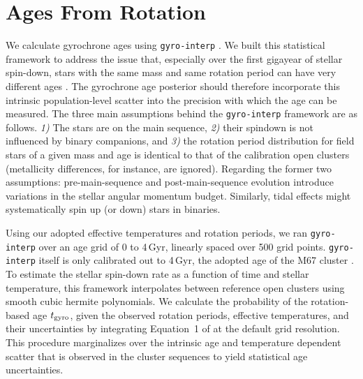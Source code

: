 \documentclass[11pt,twocolumn,tighten]{aastex63}
\begin{document}




\section{Ages From Rotation}
\label{sec:rotage}



We calculate gyrochrone ages using \texttt{gyro-interp}
\citep{Bouma_2023}.  We built this statistical framework to address
the issue that, especially over the first gigayear of stellar
spin-down, stars with the same mass and same rotation period can have
very different ages \citep[e.g.][]{Curtis_2019_ngc6811}.  The
gyrochrone age posterior should therefore incorporate this intrinsic
population-level scatter into the precision with which the age can be
measured.  The three main assumptions behind the \texttt{gyro-interp}
framework are as follows.  {\it 1)} The stars are on the main
sequence, {\it 2)} their spindown is not influenced by binary
companions, and {\it 3)} the rotation period distribution for field
stars of a given mass and age is identical to that of the calibration
open clusters (metallicity differences, for instance, are ignored).  
Regarding the former two assumptions: pre-main-sequence and
post-main-sequence evolution introduce variations in the stellar
angular momentum budget.  Similarly, tidal effects might
systematically spin up (or down) stars in binaries.

Using our adopted effective temperatures and rotation periods, we ran
\texttt{gyro-interp} over an age grid of 0 to 4\,Gyr, linearly spaced
over 500 grid points.  \texttt{gyro-interp} itself is only calibrated
out to 4\,Gyr, the adopted age of the M67 cluster
\citep[see][]{Dungee_2022,Gruner_2023}.  To estimate the stellar
spin-down rate as a function of time and stellar temperature, this
framework interpolates between reference open clusters using smooth
cubic hermite polynomials.  We calculate the probability of the
rotation-based age $t_{\rm gyro}$, given the observed rotation
periods, effective temperatures, and their uncertainties by
integrating Equation~1 of \citep{Bouma_2023} at the default grid
resolution.  This procedure marginalizes over the intrinsic age and
temperature dependent scatter that is observed in the cluster
sequences to yield statistical age uncertainties.
\end{document}
